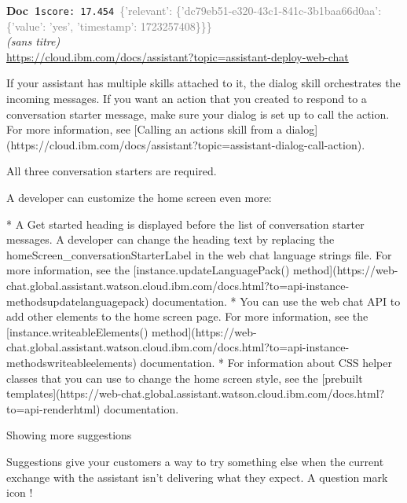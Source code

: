 \documentclass[a4paper,11pt]{article}
\begin{document}
\begin{docenv}
{\footnotesize\textcolor{doccolor}{\textbf{Doc~1}}}\hfill{\tiny\texttt{score:~17.454}}\ {\tiny\textcolor{gray}{\{'relevant': \{'dc79eb51-e320-43c1-841c-3b1baa66d0aa': \{'value': 'yes', 'timestamp': 1723257408\}\}\}}}\\[3pt]
{\small\textit{(sans titre)}}\\[2pt]
{\tiny\url{https://cloud.ibm.com/docs/assistant?topic=assistant-deploy-web-chat}}\\[4pt]
{\footnotesize 
If your assistant has multiple skills attached to it, the dialog skill orchestrates the incoming messages. If you want an action that you created to respond to a conversation starter message, make sure your dialog is set up to call the action. For more information, see [Calling an actions skill from a dialog](https://cloud.ibm.com/docs/assistant?topic=assistant-dialog-call-action).

All three conversation starters are required.



A developer can customize the home screen even more:



* A Get started heading is displayed before the list of conversation starter messages. A developer can change the heading text by replacing the homeScreen\_conversationStarterLabel in the web chat language strings file. For more information, see the [instance.updateLanguagePack() method](https://web-chat.global.assistant.watson.cloud.ibm.com/docs.html?to=api-instance-methodsupdatelanguagepack) documentation.
* You can use the web chat API to add other elements to the home screen page. For more information, see the [instance.writeableElements() method](https://web-chat.global.assistant.watson.cloud.ibm.com/docs.html?to=api-instance-methodswriteableelements) documentation.
* For information about CSS helper classes that you can use to change the home screen style, see the [prebuilt templates](https://web-chat.global.assistant.watson.cloud.ibm.com/docs.html?to=api-renderhtml) documentation.







 Showing more suggestions 

Suggestions give your customers a way to try something else when the current exchange with the assistant isn't delivering what they expect. A question mark icon !}
\end{docenv}
\end{document}
